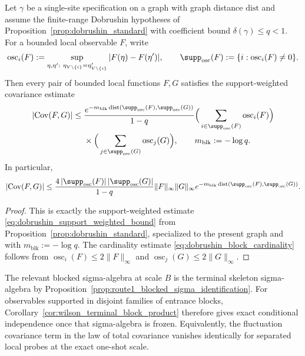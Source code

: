 \begin{lemma}\label{lem:dobrushin_to_block_decay}
Let $\gamma$ be a single-site specification on a graph with graph distance $\mathrm{dist}$ and assume the finite-range Dobrushin hypotheses of Proposition~\ref{prop:dobrushin_standard} with coefficient bound $\delta(\gamma)\le q<1$.
For a bounded local observable $F$, write
\[
\operatorname{osc}_i(F):=
\sup_{\eta,\eta':\ \eta_{V\setminus\{i\}}=\eta'_{V\setminus\{i\}}}
|F(\eta)-F(\eta')|,
\qquad
\supp_{\mathrm{osc}}(F):=\{i:\operatorname{osc}_i(F)\neq0\}.
\]
Then every pair of bounded local functions $F,G$ satisfies the support-weighted covariance estimate
\begin{equation}\label{eq:dobrushin_block_support_weighted}
\begin{aligned}
|\mathrm{Cov}(F,G)|
\le{}&\frac{e^{-m_{\mathrm{blk}}\,\mathrm{dist}(\supp_{\mathrm{osc}}(F),\supp_{\mathrm{osc}}(G))}}{1-q}
\Big(\sum_{i\in \supp_{\mathrm{osc}}(F)}\operatorname{osc}_i(F)\Big)\\
&\times\Big(\sum_{j\in \supp_{\mathrm{osc}}(G)}\operatorname{osc}_j(G)\Big),
\qquad m_{\mathrm{blk}}:=-\log q.
\end{aligned}
\end{equation}
In particular,
\begin{equation}\label{eq:dobrushin_block_cardinality}
|\mathrm{Cov}(F,G)|
\le
\frac{4\,|\supp_{\mathrm{osc}}(F)|\,|\supp_{\mathrm{osc}}(G)|}{1-q}
\|F\|_\infty\|G\|_\infty
 e^{-m_{\mathrm{blk}}\,\mathrm{dist}(\supp_{\mathrm{osc}}(F),\supp_{\mathrm{osc}}(G))}.
\end{equation}
\end{lemma}

\begin{proof}
This is exactly the support-weighted estimate \eqref{eq:dobrushin_support_weighted_bound} from Proposition~\ref{prop:dobrushin_standard}, specialized to the present graph and with $m_{\mathrm{blk}}:=-\log q$.
The cardinality estimate \eqref{eq:dobrushin_block_cardinality} follows from $\operatorname{osc}_i(F)\le 2\|F\|_\infty$ and $\operatorname{osc}_j(G)\le 2\|G\|_\infty$.
\end{proof}

\begin{remark}
The relevant blocked sigma-algebra at scale $B$ is the terminal skeleton sigma-algebra by Proposition~\ref{prop:route1_blocked_sigma_identification}.
For observables supported in disjoint families of entrance blocks, Corollary~\ref{cor:wilson_terminal_block_product} therefore gives exact conditional independence once that sigma-algebra is frozen.
Equivalently, the fluctuation covariance term in the law of total covariance vanishes identically for separated local probes at the exact one-shot scale.
\end{remark}

